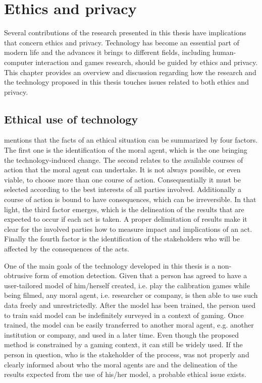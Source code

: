 \chapter{Ethics and privacy}
\label{ch:ethics}

Several contributions of the research presented in this thesis have implications that concern ethics and privacy. Technology has become an essential part of modern life and the advances it brings to different fields, including human-computer interaction and games research, should be guided by ethics and privacy. This chapter provides an overview and discussion regarding how the research and the technology proposed in this thesis touches issues related to both ethics and privacy.

\section{Ethical use of technology}
\label{sec:ethics-ethical}

\textcite{mason1995applying} mentions that the facts of an ethical situation can be summarized by four factors. The first one is the identification of the moral agent, which is the one bringing the technology-induced change. The second relates to the available courses of action that the moral agent can undertake. It is not always possible, or even viable, to choose more than one course of action. Consequentially it must be selected according to the best interests of all parties involved. Additionally a course of action is bound to have consequences, which can be irreversible. In that light, the third factor emerges, which is the delineation of the results that are expected to occur if each act is taken. A proper delimitation of results make it clear for the involved parties how to measure impact and implications of an act. Finally the fourth factor is the identification of the stakeholders who will be affected by the consequences of the acts.

One of the main goals of the technology developed in this thesis is a non-obtrusive form of emotion detection. Given that a person has agreed to have a user-tailored model of him/herself created, i.e. play the calibration games while being filmed, any moral agent, i.e. researcher or company, is then able to use such data freely and unrestrictedly. After the model has been trained, the person used to train said model can be indefinitely surveyed in a context of gaming. Once trained, the model can be easily transferred to another moral agent, e.g. another institution or company, and used in a later time. Even though the proposed method is constrained by a gaming context, it can still be widely used. If the person in question, who is the stakeholder of the process, was not properly and clearly informed about who the moral agents are and the delineation of the results expected from the use of his/her model, a probable ethical issue exists.

